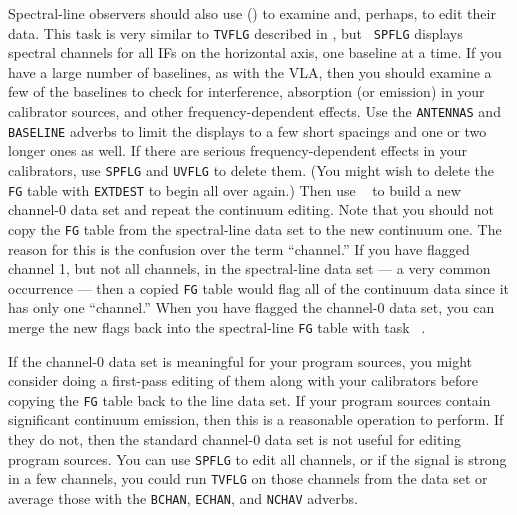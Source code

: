     Spectral-line observers should also use {\tt {}}
() to examine and, perhaps, to edit their data.  This task
is very similar to {\tt TVFLG} described in , but {\tt
SPFLG} displays spectral channels for all IFs on the horizontal axis,
one baseline at a time.  If you have a large number of baselines, as
with the VLA, then you should examine a few of the baselines to check
for interference, absorption (or emission) in your calibrator sources,
and other frequency-dependent effects.  Use the {\tt ANTENNAS} and
{\tt BASELINE} adverbs to limit the displays to a few short spacings
and one or two longer ones as well.  If there are serious
frequency-dependent effects in your calibrators, use {\tt SPFLG} and
{\tt UVFLG} to delete them.  (You might wish to delete the {\tt FG}
table with {\tt EXTDEST} to begin all over again.)  Then use {\tt
{}} to build a new channel-0 data set and repeat the
continuum editing.  Note that you should not copy the {\tt FG} table
from the spectral-line data set to the new continuum one.  The reason
for this is the confusion over the term ``channel.''  If you have
flagged channel 1, but not all channels, in the spectral-line data set
--- a very common occurrence --- then a copied {\tt FG} table would
flag all of the continuum data since it has only one ``channel.''
When you have flagged the channel-0 data set, you can merge the new
flags back into the spectral-line {\tt FG} table with task \hbox{{\tt
{}}}.

     If the channel-0 data set is meaningful for your program sources,
you might consider doing a first-pass editing of them along with your
calibrators before copying the {\tt FG} table back to the line data
set.  If your program sources contain significant continuum emission,
then this is a reasonable operation to perform.  If they do not, then
the standard channel-0 data set is not useful for editing program
sources.  You can use {\tt SPFLG} to edit all channels, or if the
signal is strong in a few channels, you could run {\tt TVFLG} on those
channels from the  data set or average those
with the {\tt BCHAN}, {\tt ECHAN}, and {\tt NCHAV} adverbs.


